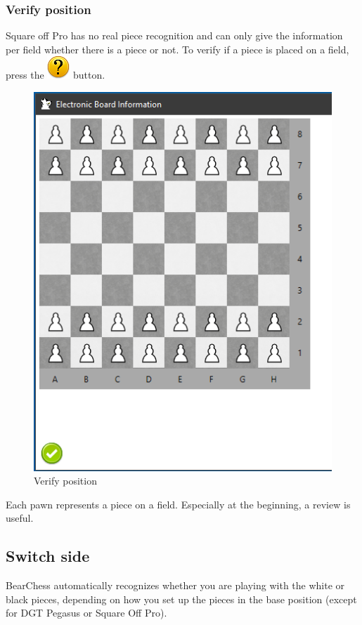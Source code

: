 \documentclass[11pt,a4paper]{article}
\begin{document}
\subsubsection{Verify position} \label{VerifyPegasusPosition}
Square off Pro has no real piece recognition and can only give the information per field whether there is a piece or not. To verify if a piece is placed on a field, press the  \includegraphics[scale=0.4]{emotion_question.png} button.

\begin{figure}[H]
	\centering
	\includegraphics[scale=0.8]{Pegasus5.png}
	\caption{Verify position}
	\label{fig:SquareOffPro5}
\end{figure}

Each pawn represents a piece on a field. Especially at the beginning, a review is useful. 



\subsection{Switch side}
BearChess automatically recognizes whether you are playing with the white or black pieces, depending on how you set up the pieces in the base position (except for DGT Pegasus or Square Off Pro).
\end{document}
